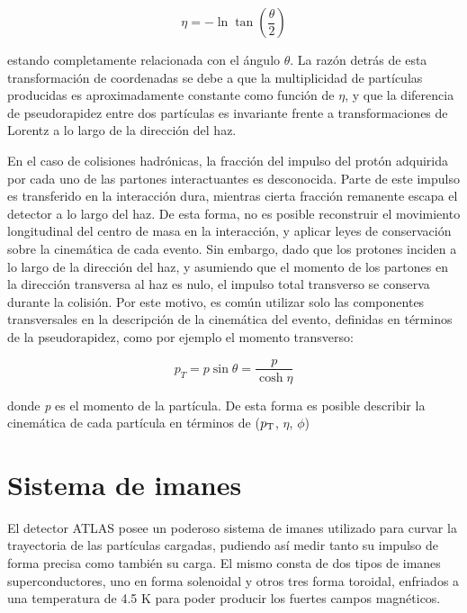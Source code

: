 \begin{equation}
\eta =-\ln \tan\left( \frac{\theta}{2} \right)
\end{equation}

\noindent
estando completamente relacionada con el ángulo $\theta$. La razón detrás de esta transformación de coordenadas se debe a que la multiplicidad de partículas producidas es aproximadamente constante como función de $\eta$, y que la diferencia de pseudorapidez entre dos partículas es invariante frente a transformaciones de Lorentz a lo largo de la dirección del haz. 


En el caso de colisiones hadrónicas, la fracción del impulso del protón adquirida por cada uno de las partones interactuantes es desconocida. Parte de este impulso es transferido en la interacción dura, mientras cierta fracción remanente escapa el detector a lo largo del haz. De esta forma, no es posible reconstruir el movimiento longitudinal del centro de masa en la interacción, y aplicar leyes de conservación sobre la cinemática de cada evento. Sin embargo, dado que los protones inciden a lo largo de la dirección del haz, y asumiendo que el momento de los partones en la dirección transversa al haz es nulo, el impulso total transverso se conserva durante la colisión. Por este motivo, es común utilizar solo las componentes transversales en la descripción de la cinemática del evento, definidas en términos de la pseudorapidez, como por ejemplo el momento transverso:

\begin{equation}
p_{T}=p\sin\theta=\frac{p}{\cosh{\eta}}
\end{equation}

\noindent
donde \textit{p} es el momento de la partícula. De esta forma es posible describir la cinemática de cada partícula en términos de ($p_{\text{T}}$, $\eta$, $\phi$)

\section{Sistema de imanes}

El detector ATLAS posee un poderoso sistema de imanes \cite{magnet} utilizado para curvar la trayectoria de las partículas cargadas, pudiendo así medir tanto su impulso de forma precisa como también su carga. El mismo consta de dos tipos de imanes superconductores, uno en forma solenoidal y otros tres forma toroidal, enfriados a una temperatura de 4.5 K para poder producir los fuertes campos magnéticos.

